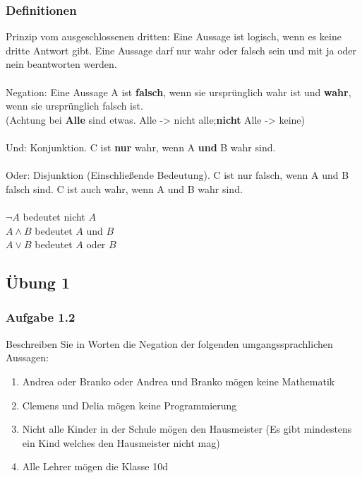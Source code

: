 \documentclass[11pt, a4paper]{article}
\begin{document}
\subsubsection{Definitionen}
Prinzip vom ausgeschlossenen dritten: Eine Aussage ist logisch, wenn es keine dritte Antwort gibt. Eine Aussage darf nur wahr oder falsch sein und mit ja oder nein beantworten werden.\\\\
Negation: Eine Aussage A ist \textbf{falsch}, wenn sie ursprünglich wahr ist und \textbf{wahr}, wenn sie ursprünglich falsch ist.\\(Achtung bei \textbf{Alle} sind etwas. Alle -> nicht alle;\textbf{nicht} Alle -> keine)\\\\
Und: Konjunktion. C ist \textbf{nur} wahr, wenn A \textbf{und} B wahr sind.\\\\
Oder: Disjunktion (Einschließende Bedeutung). C ist nur falsch, wenn A und B falsch sind. C ist auch wahr, wenn A und B wahr sind.\\\\
$\lnot A$ bedeutet nicht $A$\\
$A \land B$ bedeutet $A$ und $B$\\
$A \lor B$ bedeutet $A$ oder $B$

\subsection{Übung 1}
\subsubsection{Aufgabe 1.2}
Beschreiben Sie in Worten die Negation der folgenden umgangssprachlichen Aussagen:
\begin{enumerate}[label=\alph*)]
\item \glqq Andrea oder Branko oder Andrea und Branko mögen keine Mathematik\grqq
\item \glqq Clemens und Delia mögen keine Programmierung\grqq
\item \glqq Nicht alle Kinder in der Schule mögen den Hausmeister (Es gibt mindestens ein Kind welches den Hausmeister nicht mag)\grqq
\item \glqq Alle Lehrer mögen die Klasse 10d\grqq
\end{enumerate}
\end{document}
